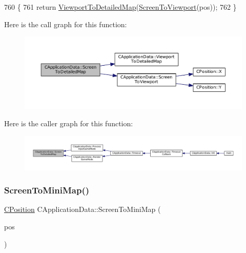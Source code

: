 \begin{DoxyCode}
760                                                                    \{
761     \textcolor{keywordflow}{return} \hyperlink{classCApplicationData_a2871f1b0855d14ed77db1abd83585d64}{ViewportToDetailedMap}(\hyperlink{classCApplicationData_aebd3ae4cfd74962413024f1649233f08}{ScreenToViewport}(pos));
762 \}
\end{DoxyCode}
Here is the call graph for this function\+:
\nopagebreak
\begin{figure}[H]
\begin{center}
\leavevmode
\includegraphics[width=350pt]{classCApplicationData_a5c8b0ebf35fddb89b22f035544c32222_cgraph}
\end{center}
\end{figure}
Here is the caller graph for this function\+:
\nopagebreak
\begin{figure}[H]
\begin{center}
\leavevmode
\includegraphics[width=350pt]{classCApplicationData_a5c8b0ebf35fddb89b22f035544c32222_icgraph}
\end{center}
\end{figure}
\hypertarget{classCApplicationData_a61dfd0d1f56382b3a8f21add40e1f74a}{}\label{classCApplicationData_a61dfd0d1f56382b3a8f21add40e1f74a} 
\subsubsection{\texorpdfstring{Screen\+To\+Mini\+Map()}{ScreenToMiniMap()}}
{\footnotesize\ttfamily \hyperlink{classCPosition}{C\+Position} C\+Application\+Data\+::\+Screen\+To\+Mini\+Map (\begin{DoxyParamCaption}\item[{const \hyperlink{classCPosition}{C\+Position} \&}]{pos }\end{DoxyParamCaption})\hspace{0.3cm}{\ttfamily [protected]}}



